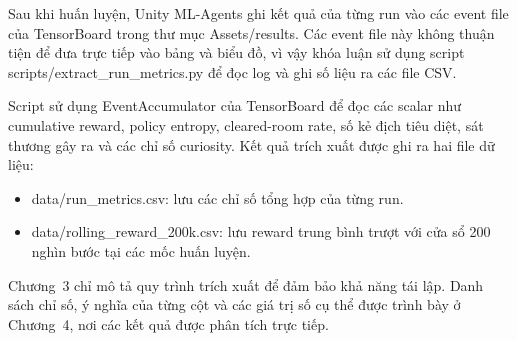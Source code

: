 Sau khi huấn luyện, Unity ML-Agents ghi kết quả của từng run vào các event file của TensorBoard trong thư mục Assets/results. Các event file này không thuận tiện để đưa trực tiếp vào bảng và biểu đồ, vì vậy khóa luận sử dụng script scripts/extract\_run\_metrics.py để đọc log và ghi số liệu ra các file CSV.

Script sử dụng EventAccumulator của TensorBoard để đọc các scalar như cumulative reward, policy entropy, cleared-room rate, số kẻ địch tiêu diệt, sát thương gây ra và các chỉ số curiosity. Kết quả trích xuất được ghi ra hai file dữ liệu:

\begin{itemize}
    \item data/run\_metrics.csv: lưu các chỉ số tổng hợp của từng run.
    \item data/rolling\_reward\_200k.csv: lưu reward trung bình trượt với cửa sổ 200 nghìn bước tại các mốc huấn luyện.
\end{itemize}

Chương~3 chỉ mô tả quy trình trích xuất để đảm bảo khả năng tái lập. Danh sách chỉ số, ý nghĩa của từng cột và các giá trị số cụ thể được trình bày ở Chương~4, nơi các kết quả được phân tích trực tiếp.
